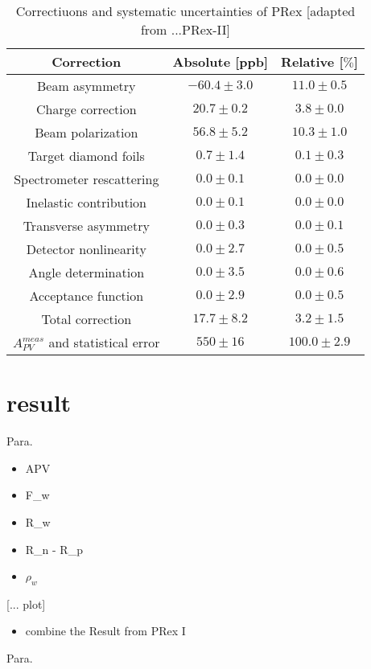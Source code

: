 \begin{table}[]
    \centering
    \begin{tabular}{c c c} \\ 
    \hline
         Correction     & Absolute [ppb] & Relative [$\%$]  \\ \hline
         Beam asymmetry & $-60.4 \pm 3.0$ & $11.0 \pm 0.5$ \\ 
         Charge correction & $20.7 \pm 0.2$ & $3.8 \pm 0.0$ \\
         Beam polarization & $56.8 \pm 5.2$ & $10.3 \pm 1.0$ \\
         Target diamond foils & $0.7 \pm 1.4$ & $0.1 \pm 0.3$ \\
         Spectrometer rescattering & $0.0 \pm 0.1$ & $0.0 \pm 0.0$ \\
         Inelastic contribution & $0.0 \pm 0.1$ & $0.0 \pm 0.0$ \\
         Transverse asymmetry & $0.0 \pm 0.3$ & $0.0 \pm 0.1$ \\
         Detector nonlinearity & $0.0 \pm 2.7$ & $0.0 \pm 0.5$ \\
         Angle determination & $0.0 \pm 3.5$ & $0.0 \pm 0.6$ \\
         Acceptance function & $ 0.0 \pm 2.9$ & $0.0 \pm 0.5$ \\
         Total correction & $17.7 \pm 8.2$ & $3.2 \pm 1.5$ \\
         $A_{PV}^{meas}$ and statistical error & $550 \pm 16$ & $100.0 \pm 2.9$ \\ \hline
    \end{tabular}
    \caption{Correctiuons and systematic uncertainties of PRex [adapted from ...PRex-II]}
    \label{tab:my_label}
\end{table}

\section{result}

Para.
\begin{itemize}
    \item APV
    \item F_w
    \item R_w
    \item R_n - R_p
    \item $\rho_w$
\end{itemize}


[... plot]

\begin{itemize}
    \item combine the Result from PRex I
\end{itemize}
Para.
